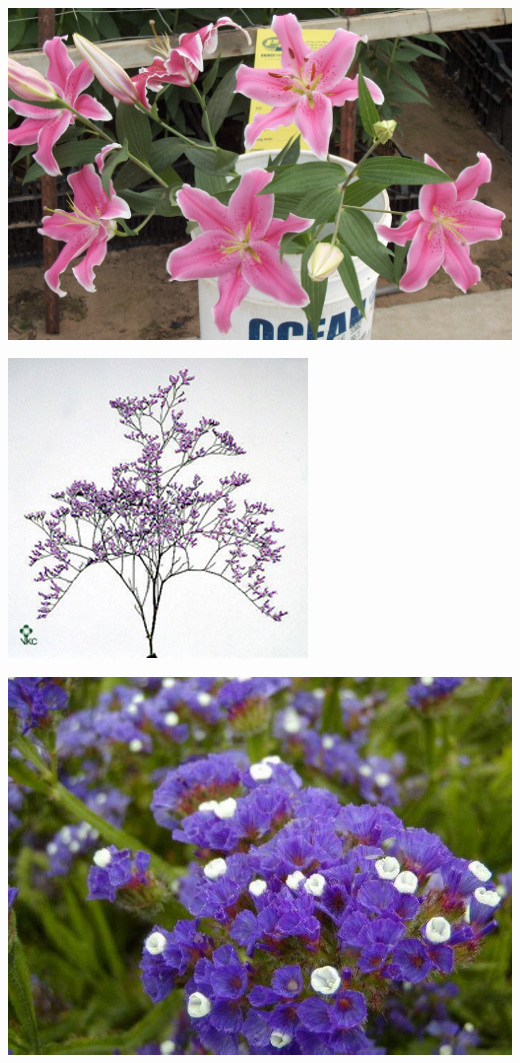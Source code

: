 \documentclass{article}
\begin{document}
\begin{center}
\includegraphics[height=0.9\textheight, angle=90]{../Lily_Oriental.jpg}
\end{center}
\newpage

\begin{center}
\includegraphics[height=0.9\textheight, angle=90]{../Limonium_MistyBlue.jpg}
\end{center}
\newpage

\begin{center}
\includegraphics[height=0.9\textheight, angle=90]{../Limonium_sinuatum.jpg}
\end{center}
\newpage
\end{document}
